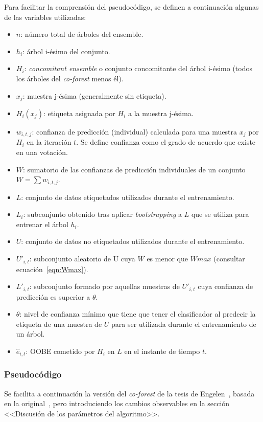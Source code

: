 Para facilitar la comprensión del pseudocódigo, se definen a continuación algunas de las variables utilizadas:
\begin{itemize}
	\item $n$: número total de árboles del ensemble.
	\item $h_{i}$: árbol i-ésimo del conjunto.
	\item $H_{i}$: \textit{concomitant ensemble} o conjunto concomitante del árbol i-ésimo (todos los árboles del \textit{co-forest} menos él).
	\item $x_j$: muestra j-ésima (generalmente sin etiqueta).
	\item $H_i(x_j)$: etiqueta asignada por $H_i$ a la muestra j-ésima.
	\item $w_{i,t,j}$: confianza de predicción (individual) calculada para una muestra $x_j$ por $H_{i}$ en la iteración $t$. Se define confianza como el grado de acuerdo que existe en una votación. 
	\item $W$: sumatorio de las confianzas de predicción individuales de un conjunto $W = \sum w_{i,t,j}$.
	\item $L$: conjunto de datos etiquetados utilizados durante el entrenamiento.
	\item $L_{i}$: subconjunto obtenido tras aplicar \textit{bootstrapping} a $L$ que se utiliza para entrenar el árbol $h_{i}$.
	\item $U$: conjunto de datos no etiquetados utilizados durante el entrenamiento.
	\item $U'_{i,t}$: subconjunto aleatorio de U cuya $W$ es menor que $Wmax$ (consultar ecuación~\ref{eqn:Wmax}).
	\item $L'_{i,t}$: subconjunto formado por aquellas muestras de $U'_{i,t}$ cuya confianza de predicción es superior a $\theta$.
	\item $\theta$: nivel de confianza mínimo que tiene que tener el clasificador al predecir la etiqueta de una muestra de $U$ para ser utilizada durante el entrenamiento de un árbol.
	\item $\hat{e}_{i,t}$: OOBE cometido por $H_{i}$ en $L$ en el instante de tiempo $t$.
\end{itemize} 

\subsubsection{Pseudocódigo}

Se facilita a continuación la versión del \textit{co-forest} de la tesis de Engelen~\cite{engelen2018thesis}, basada en la original~\cite{originalCoForest2007}, pero introduciendo los cambios observables en la sección <<Discusión de los parámetros del algoritmo>>.

